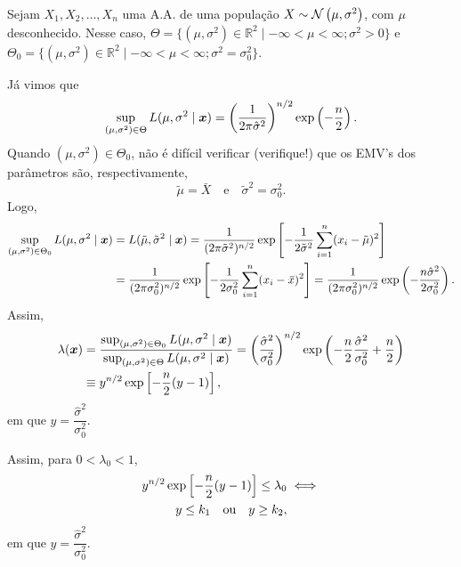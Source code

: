 \begin{theorem}[$\mathcal{H}_0:\sigma^2=\sigma_0^2$ \emph{vs.} $\mathcal{H}_1:\sigma^2\neq\sigma_0^2$ -- $\mu$ desconhecido]
Sejam $X_1,X_2,\ldots,X_n$ uma A.A. de uma população $X\sim\normdist{\mu,\sigma^2}$, com $\mu$ desconhecido. Nesse caso, $\Theta=\{(\mu,\sigma^2)\in\mathbb{R}^2\mid-\infty<\mu<\infty;\sigma^2>0\}$ e $\Theta_0=\{(\mu,\sigma^2)\in\mathbb{R}^2\mid-\infty<\mu<\infty;\sigma^2=\sigma_0^2\}$.

Já vimos que
\begin{equation}
\sup_{(\mu,\sigma^2)\in\Theta}L(\mu,\sigma^2\mid\bm{x}) = \left(\frac{1}{2\pi\hat{\sigma}^2}\right)^{n/2}\exp\left(-\frac{n}{2}\right).
\end{equation}
Quando $(\mu,\sigma^2)\in\Theta_0$, não é difícil verificar (verifique!) que os EMV's dos parâmetros são, respectivamente,
\begin{equation}
\tilde{\mu}=\bar{X} \quad \text{e} \quad \tilde{\sigma}^2=\sigma_0^2.
\end{equation}
Logo,
\begin{align}
\sup_{(\mu,\sigma^2)\in\Theta_0}L(\mu,\sigma^2\mid\bm{x}) &= L(\tilde{\mu},\tilde{\sigma}^2\mid\bm{x}) = \frac{1}{(2\pi\tilde{\sigma}^2)^{n/2}}\exp\left[-\frac{1}{2\tilde{\sigma}^2}\sum_{i=1}^n(x_i-\tilde{\mu})^2\right]\notag\\
&= \frac{1}{(2\pi\sigma_0^2)^{n/2}}\exp\left[-\frac{1}{2\sigma_0^2}\sum_{i=1}^n(x_i-\,\overline{\!{x}})^2\right] = \frac{1}{(2\pi\sigma_0^2)^{n/2}}\exp\left(-\frac{n\hat{\sigma}^2}{2\sigma_0^2}\right).
\end{align}
Assim,
\begin{align}
\lambda(\bm{x}) &= \frac{\sup_{(\mu,\sigma^2)\in\Theta_0}L(\mu,\sigma^2\mid\bm{x})}{\sup_{(\mu,\sigma^2)\in\Theta}L(\mu,\sigma^2\mid\bm{x})} = \left(\frac{\hat{\sigma}^2}{\sigma_0^2}\right)^{n/2}\exp\left(-\frac{n}{2}\frac{\hat{\sigma}^2}{\sigma_0^2}+\frac{n}{2}\right)\notag\\
&\equiv y^{n/2}\exp\left[-\frac{n}{2}(y-1)\right],
\end{align}
em que $y=\dfrac{\hat{\sigma}^2}{\sigma_0^2}$.

Assim, para $0<\lambda_0<1$,
\begin{align}
y^{n/2}\exp\left[-\frac{n}{2}(y-1)\right]\leq\lambda_0 &\iff\notag\\
y\leq k_1 \quad \text{ou} \quad y\geq k_2, & 
\end{align}
em que $y=\dfrac{\hat{\sigma}^2}{\sigma_0^2}$.


\end{theorem}
